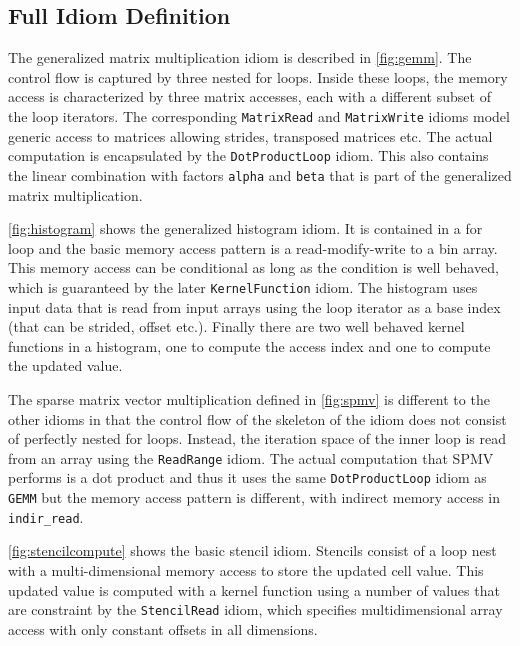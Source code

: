 \subsection{Full Idiom Definition}

    The generalized matrix multiplication idiom is described in
    \autoref{fig:gemm}.
    The control flow is captured by three nested for loops.
    Inside these loops, the memory access is characterized by three matrix
    accesses, each with a different subset of the loop iterators.
    The corresponding \texttt{MatrixRead} and \texttt{MatrixWrite} idioms model
    generic access to matrices allowing strides, transposed matrices etc.
    The actual computation is encapsulated by the \texttt{DotProductLoop} idiom.
    This also contains the linear combination with factors \texttt{alpha} and
    \texttt{beta} that is part of the generalized matrix multiplication.

    \autoref{fig:histogram} shows the generalized histogram idiom.
    It is contained in a for loop and the basic memory access pattern is a
    read-modify-write to a bin array.
    This memory access can be conditional as long as the condition is well
    behaved, which is guaranteed by the later
    \texttt{KernelFunction} idiom.
    The histogram uses input data that is read from input arrays using the loop iterator as a base index (that can be
    strided, offset etc.).
    Finally there are two well behaved kernel functions in a histogram, one to compute the access index and one to compute
    the updated value.

The sparse matrix vector multiplication defined in \autoref{fig:spmv} is different to the other idioms in that
the control flow of the skeleton of the idiom does not consist of perfectly nested for loops.
Instead, the iteration space of the inner loop is read from an array using the \texttt{ReadRange} idiom.
The actual computation that SPMV performs is a dot product and thus it uses the same \texttt{DotProductLoop} idiom as
\texttt{GEMM} but the memory access pattern is different, with indirect memory access in \texttt{indir\_read}.

    \autoref{fig:stencilcompute} shows the basic stencil idiom.
    Stencils consist of a loop nest with a multi-dimensional memory access to
    store the updated cell value.
    This updated value is computed with a kernel function using a number of
    values that are constraint by the
    \texttt{StencilRead} idiom, which specifies multidimensional array access
    with only constant offsets in all dimensions.

